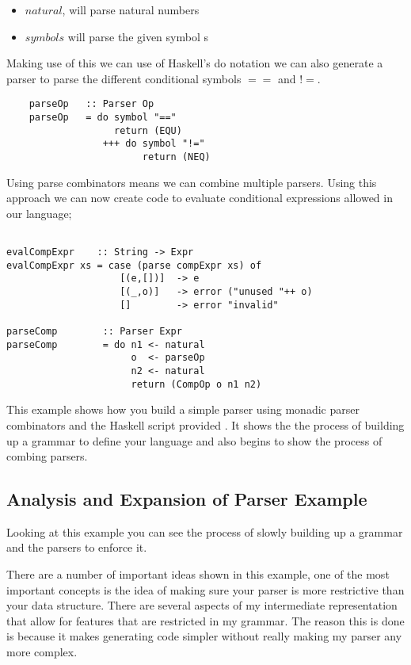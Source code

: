 \begin{itemize}
\item $natural$, will parse natural numbers
\item $symbol s$ will parse the given symbol s 
\end{itemize}

Making use of this we can use of Haskell's do notation we can also generate a parser to parse the different conditional symbols $==$ and $!=$. 

\begin{lstlisting}
	parseOp   :: Parser Op
	parseOp   = do symbol "=="
	               return (EQU)
        	     +++ do symbol "!="
	                    return (NEQ) 
\end{lstlisting} 

Using parse combinators means we can combine multiple parsers. Using this approach we can now create code to evaluate conditional expressions allowed in our language;

\begin{lstlisting}

evalCompExpr    :: String -> Expr
evalCompExpr xs = case (parse compExpr xs) of
                    [(e,[])]  -> e
                    [(_,o)]   -> error ("unused "++ o)
                    []        -> error "invalid"

parseComp        :: Parser Expr	
parseComp        = do n1 <- natural
                      o  <- parseOp 
                      n2 <- natural
                      return (CompOp o n1 n2)  
\end{lstlisting}

This example shows how you build a simple parser using monadic parser combinators and the Haskell script provided %
. It shows the the process of building up a grammar to define your language and also begins to show the process of combing parsers. 


\subsection{Analysis and Expansion of Parser Example}

Looking at this example you can see the process of slowly building up a grammar and the parsers to enforce it.

There are a number of important ideas shown in this example, one of the most important concepts is the idea of making sure your parser is more restrictive than your data structure. There are several aspects of my intermediate representation that allow for features that are restricted in my grammar. The reason this is done is because it makes generating code simpler without really making my parser any more complex.  

